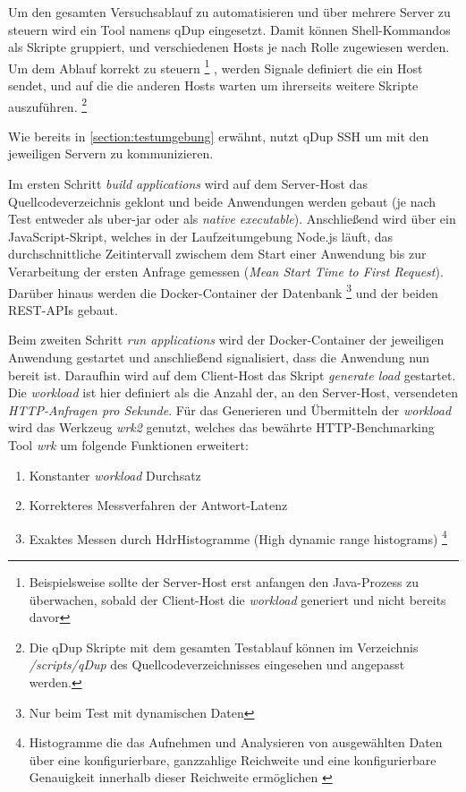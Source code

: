   Um den gesamten Versuchsablauf zu automatisieren und über mehrere Server zu steuern wird ein Tool namens qDup eingesetzt.
  Damit können Shell-Kommandos als Skripte gruppiert, und verschiedenen Hosts je nach Rolle zugewiesen werden.
  Um dem Ablauf korrekt zu steuern
  \footnote{Beispielsweise sollte der Server-Host erst anfangen den Java-Prozess zu überwachen, sobald der Client-Host die \textit{workload}
  generiert und nicht bereits davor}
  , werden Signale definiert die ein Host sendet, und auf die die anderen Hosts warten um ihrerseits
  weitere Skripte auszuführen.
  \footnote{Die qDup Skripte mit dem gesamten Testablauf können im Verzeichnis \textit{/scripts/qDup} des Quellcodeverzeichnisses eingesehen und
angepasst werden.}

  Wie bereits in \ref{section:testumgebung} erwähnt, nutzt qDup SSH um mit den jeweiligen Servern zu kommunizieren.

  Im ersten Schritt \textit{build applications} wird auf dem Server-Host das Quellcodeverzeichnis geklont und beide Anwendungen werden gebaut
   (je nach Test entweder als uber-jar oder als \textit{native executable}). Anschließend wird über ein JavaScript-Skript,
    welches in der Laufzeitumgebung Node.js läuft, das durchschnittliche Zeitintervall zwischem dem Start einer Anwendung bis 
    zur Verarbeitung der ersten Anfrage gemessen
   (\textit{Mean Start Time to First Request}). Darüber hinaus werden die Docker-Container der Datenbank
   \footnote{Nur beim Test mit dynamischen Daten} und der beiden REST-APIs gebaut.
   
  Beim zweiten Schritt \textit{run applications} wird der Docker-Container der jeweiligen Anwendung gestartet und anschließend signalisiert,
  dass die Anwendung nun bereit ist. 
  Daraufhin wird auf dem Client-Host das Skript \textit{generate load} gestartet.
  Die \textit{workload} ist hier definiert als die Anzahl der, an den Server-Host, versendeten \textit{HTTP-Anfragen pro Sekunde}.
  Für das Generieren und Übermitteln der \textit{workload} wird das Werkzeug \textit{wrk2} genutzt, welches das 
  bewährte HTTP-Benchmarking Tool \textit{wrk} um folgende Funktionen erweitert:
  \begin{enumerate}
      \item Konstanter \textit{workload} Durchsatz
      \item Korrekteres Messverfahren der Antwort-Latenz
      \item Exaktes Messen durch HdrHistogramme (High dynamic range histograms)
      \footnote{Histogramme die das Aufnehmen und Analysieren von 
      ausgewählten Daten über eine konfigurierbare, ganzzahlige Reichweite und eine konfigurierbare 
      Genauigkeit innerhalb dieser Reichweite ermöglichen \parencite{HdrHistogram}}
  \end{enumerate}\parencite{Wrk2, Wrk}

